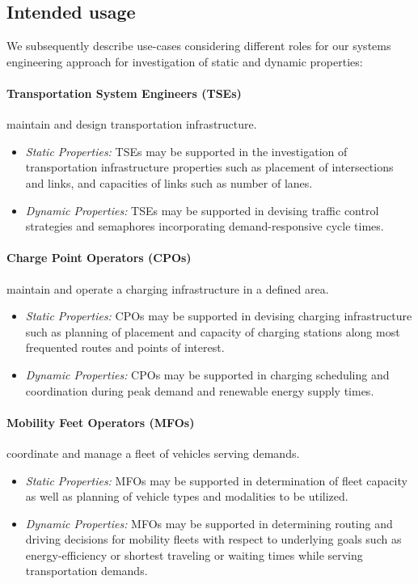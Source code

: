\documentclass[a4paper,twoside]{article}
\begin{document}
	\subsection{Intended usage}
	\label{sec:scope}
	
	We subsequently describe use-cases considering different roles for our systems engineering approach for investigation of static and dynamic properties:

	\paragraph{Transportation System Engineers (TSEs)} maintain and design transportation infrastructure.
	\begin{itemize}
		\item \textit{Static Properties:} TSEs may be supported in the investigation of transportation infrastructure properties such as placement of intersections and links, and capacities of links such as number of lanes.
		\item \textit{Dynamic Properties:} TSEs may be supported in devising traffic control strategies and semaphores incorporating demand-responsive cycle times.
	\end{itemize}
	
	\paragraph{Charge Point Operators (CPOs)} maintain and operate a charging infrastructure in a defined area.
	\begin{itemize}
		\item \textit{Static Properties:} CPOs may be supported in devising charging infrastructure such as planning of placement and capacity of charging stations along most frequented routes and points of interest. 
		\item \textit{Dynamic Properties:} CPOs may be supported in charging scheduling and coordination during peak demand and renewable energy supply times.
	\end{itemize}

	\paragraph{Mobility Feet Operators (MFOs)} coordinate and manage a fleet of vehicles serving demands. 
	\begin{itemize}
		\item \textit{Static Properties:} MFOs may be supported in determination of fleet capacity as well as planning of vehicle types and modalities to be utilized.
		\item \textit{Dynamic Properties:} MFOs may be supported in determining routing and driving decisions for mobility fleets with respect to underlying goals such as energy-efficiency or shortest traveling or waiting times while serving transportation demands.
	\end{itemize}
	
\end{document}
